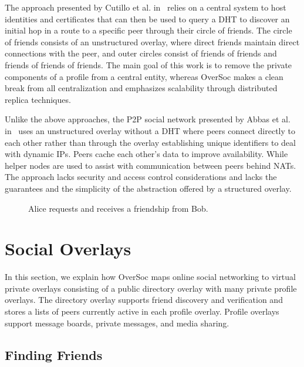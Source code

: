 \documentclass{IEEEtran}
\begin{document}
The approach presented by Cutillo et al. in~\cite{matryoshka} relies on a
central system to host identities and certificates that can then be used to
query a DHT to discover an initial hop in a route to a specific peer through
their circle of friends.  The circle of friends consists of an unstructured
overlay, where direct friends maintain direct connections with the peer, and
outer circles consist of friends of friends and friends of friends of friends.
The main goal of this work is to remove the private components of a profile
from a central entity, whereas OverSoc makes a clean break from all
centralization and emphasizes scalability through distributed replica
techniques.

Unlike the above approaches, the P2P social network presented by Abbas et al.
in~\cite{tribler-osn} uses an unstructured overlay without a DHT where peers
connect directly to each other rather than through the overlay establishing
unique identifiers to deal with dynamic IPs.  Peers cache each other's data to
improve availability.  While helper nodes are used to assist with
communication between peers behind NATs.  The approach lacks security and
access control considerations and lacks the guarantees and the simplicity of
the abstraction offered by a structured overlay.

\begin{figure*}[h!t!]
\centering
{}
\caption{Alice requests and receives a friendship from Bob.}
\label{fig:friend_request}
\end{figure*}

\section{Social Overlays}
\label{social_overlays}

In this section, we explain how OverSoc maps online social networking to
virtual private overlays consisting of a public directory overlay with many
private profile overlays.  The directory overlay supports friend discovery and
verification and stores a lists of peers currently active in each profile
overlay.  Profile overlays support message boards, private messages, and media
sharing.

\subsection{Finding Friends}
\end{document}
